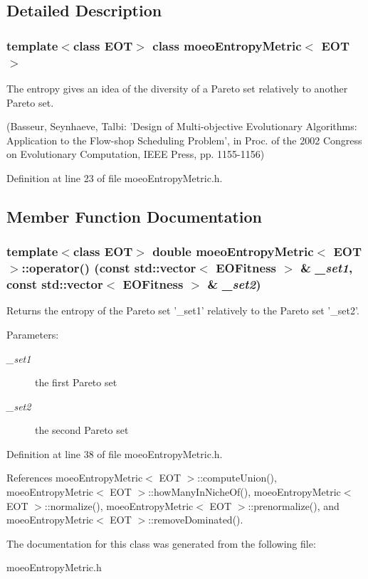 \subsection{Detailed Description}
\subsubsection*{template$<$class EOT$>$ class moeo\-Entropy\-Metric$<$ EOT $>$}

The entropy gives an idea of the diversity of a Pareto set relatively to another Pareto set. 

(Basseur, Seynhaeve, Talbi: 'Design of Multi-objective Evolutionary Algorithms: Application to the Flow-shop Scheduling Problem', in Proc. of the 2002 Congress on Evolutionary Computation, IEEE Press, pp. 1155-1156) 



Definition at line 23 of file moeo\-Entropy\-Metric.h.

\subsection{Member Function Documentation}
\subsubsection{\setlength{\rightskip}{0pt plus 5cm}template$<$class EOT$>$ double {\bf moeo\-Entropy\-Metric}$<$ EOT $>$::operator() (const std::vector$<$ {\bf EOFitness} $>$ \& {\em \_\-set1}, const std::vector$<$ {\bf EOFitness} $>$ \& {\em \_\-set2})\hspace{0.3cm}{\tt  [inline]}}\label{classmoeoEntropyMetric_58136405dfed951efa340ddf541c29fd}


Returns the entropy of the Pareto set '\_\-set1' relatively to the Pareto set '\_\-set2'. 

\begin{Desc}
\item[Parameters:]
\begin{description}
\item[{\em \_\-set1}]the first Pareto set \item[{\em \_\-set2}]the second Pareto set \end{description}
\end{Desc}


Definition at line 38 of file moeo\-Entropy\-Metric.h.

References moeo\-Entropy\-Metric$<$ EOT $>$::compute\-Union(), moeo\-Entropy\-Metric$<$ EOT $>$::how\-Many\-In\-Niche\-Of(), moeo\-Entropy\-Metric$<$ EOT $>$::normalize(), moeo\-Entropy\-Metric$<$ EOT $>$::prenormalize(), and moeo\-Entropy\-Metric$<$ EOT $>$::remove\-Dominated().

The documentation for this class was generated from the following file:\begin{CompactItemize}
\item 
moeo\-Entropy\-Metric.h\end{CompactItemize}

